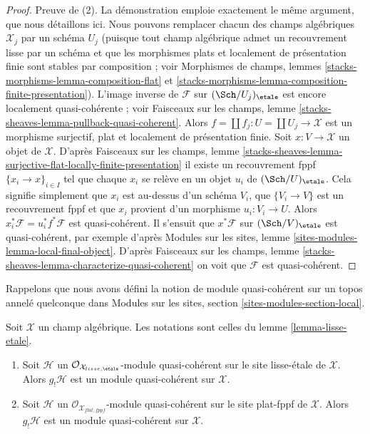 \begin{proof}
\medskip\noindent
Preuve de (2). La démonstration emploie exactement le même argument, que nous
détaillons ici. Nous pouvons remplacer chacun des champs algébriques $\mathcal{X}_j$
par un schéma $U_j$ (puisque tout champ algébrique admet un recouvrement lisse par
un schéma et que les morphismes plats et localement de présentation finie sont
stables par composition ; voir Morphismes de champs, lemmes
\ref{stacks-morphisms-lemma-composition-flat} et
\ref{stacks-morphisms-lemma-composition-finite-presentation}).
L'image inverse de $\mathcal{F}$ sur $(\Sch/U_j)_\etale$ est encore
localement quasi-cohérente ; voir
Faisceaux sur les champs, lemme \ref{stacks-sheaves-lemma-pullback-quasi-coherent}.
Alors $f = \coprod f_j : U = \coprod U_j \to \mathcal{X}$ est un morphisme
surjectif, plat et localement de présentation finie. Soit
$x : V \to \mathcal{X}$ un objet de $\mathcal{X}$. D'après
Faisceaux sur les champs, lemme
\ref{stacks-sheaves-lemma-surjective-flat-locally-finite-presentation}
il existe un recouvrement fppf $\{x_i \to x\}_{i \in I}$ tel que chaque
$x_i$ se relève en un objet $u_i$ de $(\Sch/U)_\etale$.
Cela signifie simplement que $x_i$ est au-dessus d'un schéma $V_i$, que
$\{V_i \to V\}$ est un recouvrement fppf et que $x_i$ provient
d'un morphisme $u_i : V_i \to U$. Alors
$x_i^*\mathcal{F} = u_i^*f^*\mathcal{F}$ est quasi-cohérent.
Il s'ensuit que $x^*\mathcal{F}$ sur $(\Sch/V)_\etale$
est quasi-cohérent, par exemple d'après
Modules sur les sites, lemme \ref{sites-modules-lemma-local-final-object}.
D'après Faisceaux sur les champs, lemme
\ref{stacks-sheaves-lemma-characterize-quasi-coherent}
on voit que $\mathcal{F}$ est quasi-cohérent.
\end{proof}

\noindent
Rappelons que nous avons défini la notion de module quasi-cohérent sur
un topos annelé quelconque dans
Modules sur les sites, section \ref{sites-modules-section-local}.

\begin{lemma}
\label{lemma-shriek-quasi-coherent}
Soit $\mathcal{X}$ un champ algébrique. Les notations sont celles du
lemme \ref{lemma-lisse-etale}.
\begin{enumerate}
\item Soit $\mathcal{H}$ un
$\mathcal{O}_{\mathcal{X}_{lisse,\etale}}$-module quasi-cohérent
sur le site lisse-étale de $\mathcal{X}$. Alors $g_!\mathcal{H}$ est un
module quasi-cohérent sur $\mathcal{X}$.
\item Soit $\mathcal{H}$ un
$\mathcal{O}_{\mathcal{X}_{flat,fppf}}$-module quasi-cohérent
sur le site plat-fppf de $\mathcal{X}$. Alors $g_!\mathcal{H}$ est un
module quasi-cohérent sur $\mathcal{X}$.
\end{enumerate}
\end{lemma}

